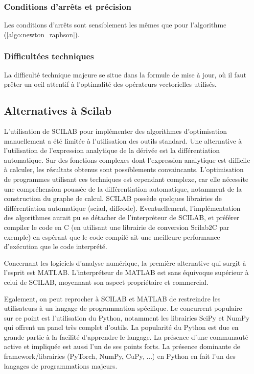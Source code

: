 \documentclass[3p, twocolumn]{elsarticle}
\begin{document}
\subsubsection{Conditions d'arrêts et précision}
Les conditions d'arrêts sont sensiblement les mêmes que pour l'algorithme (\ref{algo:newton_raphson}).

\subsubsection{Difficultées techniques}
La difficulté technique majeure se situe dans la formule de mise à jour, où il faut prêter un oeil attentif à l'optimalité des opérateurs vectorielles utilisés.

\subsection{Alternatives à Scilab}

L'utilisation de SCILAB pour implémenter des algorithmes d'optimisation manuellement a été limitée à l'utilisation des outils standard. Une alternative à l'utilisation de l'expression analytique de la dérivée est la différentiation automatique. Sur des fonctions complexes dont l'expression analytique est difficile à calculer, les résultats obtenus sont possiblements convaincants. L'optimisation de programmes utilisant ces techniques est cependant complexe, car elle nécessite une compréhension poussée de la différentiation automatique, notamment de la construction du graphe de calcul. SCILAB possède quelques librairies de différentiation automatique (sciad, diffcode). Eventuellement, l'implémentation des algorithmes aurait pu se détacher de l'interpréteur de SCILAB, et préférer compiler le code en C (en utilisant une librairie de conversion Scilab2C par exemple) en espérant que le code compilé ait une meilleure performance d'exécution que le code interprété.

Concernant les logiciels d'analyse numérique, la première alternative qui surgit à l'esprit est MATLAB. L'interpréteur de MATLAB est sans équivoque supérieur à celui de SCILAB, moyennant son aspect propriétaire et commercial.

Egalement, on peut reprocher à SCILAB et MATLAB de restreindre les utilisateurs à un langage de programmation spécifique. Le concurrent populaire sur ce point est l'utilisation du Python, notamment les librairies SciPy et NumPy qui offrent un panel très complet d'outils. La popularité du Python est due en grande partie à la facilité d'apprendre le langage. La présence d'une communauté active et impliquée est aussi l'un de ses points forts. La présence dominante de framework/librairies (PyTorch, NumPy, CuPy, ...) en Python en fait l'un des langages de programmations majeurs.
\end{document}
